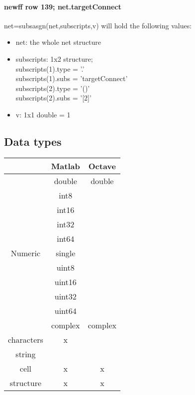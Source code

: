 \paragraph{newff row 139; net.targetConnect} net=subsasgn(net,subscripts,v) will hold the following values:
\begin{itemize}
	\item net: the whole net structure
	\item subscripts: 1x2 structure;\\
		subscripts(1).type = '.'\\
		subscripts(1).subs = 'targetConnect'\\
		subscripts(2).type = '()'\\
		subscripts(2).subs = '[2]'
	\item v: 1x1 double = 1
\end{itemize}


\subsection{Data types}

\begin{table}
	\centering
	\begin{tabular}{c c c}
		\toprule
									& Matlab										& Octave\\
		\midrule
  								& double 											& double \\
									& int8  											& \\
									& int16 											& \\
									& int32 											& \\
									& int64 											& \\
			Numeric			& single											& \\
									& uint8 											& \\
									& uint16											& \\
									& uint32 											& \\ 
									& uint64 											& \\ 
									& complex 										& complex\\
		\midrule
			characters	& x														&  \\
		\midrule
			string			&															& \\
		\midrule
			cell				&	x														& x \\
		\midrule
			structure		& x 												  & x  \\
		\bottomrule
	\end{tabular}
\end{table}